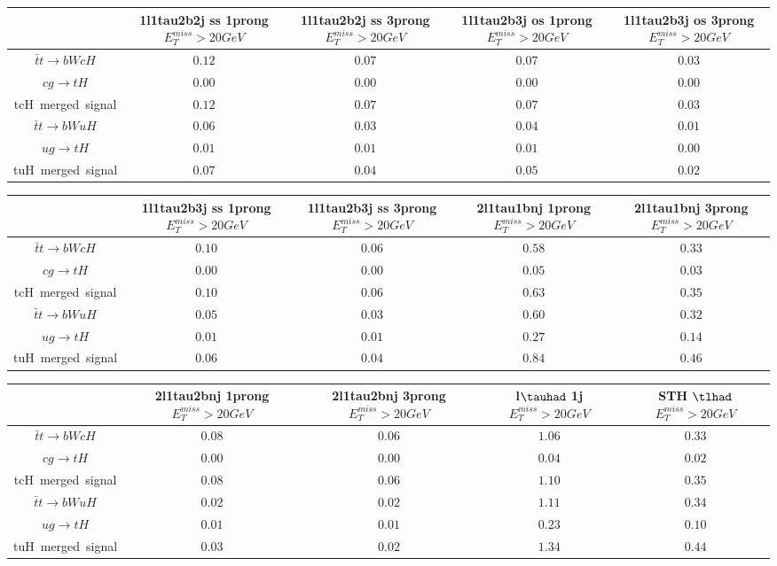 \begin{tabular}{|c|c|c|c|c|} \hline
 & 1l1tau2b2j ss 1prong  $E_T^{miss}>20GeV$ & 1l1tau2b2j ss 3prong  $E_T^{miss}>20GeV$ & 1l1tau2b3j os 1prong  $E_T^{miss}>20GeV$ & 1l1tau2b3j os 3prong  $E_T^{miss}>20GeV$\\\hline
$\bar{t}t\to bWcH$ & $0.12$ & $0.07$ & $0.07$ & $0.03$\\\hline
$cg\to tH$ & $0.00$ & $0.00$ & $0.00$ & $0.00$\\\hline
tcH~merged~signal & $0.12$ & $0.07$ & $0.07$ & $0.03$\\\hline
$\bar{t}t\to bWuH$ & $0.06$ & $0.03$ & $0.04$ & $0.01$\\\hline
$ug\to tH$ & $0.01$ & $0.01$ & $0.01$ & $0.00$\\\hline
tuH~merged~signal & $0.07$ & $0.04$ & $0.05$ & $0.02$\\\hline
\end{tabular}
\begin{tabular}{|c|c|c|c|c|} \hline
 & 1l1tau2b3j ss 1prong  $E_T^{miss}>20GeV$ & 1l1tau2b3j ss 3prong  $E_T^{miss}>20GeV$ & 2l1tau1bnj 1prong  $E_T^{miss}>20GeV$ & 2l1tau1bnj 3prong  $E_T^{miss}>20GeV$\\\hline
$\bar{t}t\to bWcH$ & $0.10$ & $0.06$ & $0.58$ & $0.33$\\\hline
$cg\to tH$ & $0.00$ & $0.00$ & $0.05$ & $0.03$\\\hline
tcH~merged~signal & $0.10$ & $0.06$ & $0.63$ & $0.35$\\\hline
$\bar{t}t\to bWuH$ & $0.05$ & $0.03$ & $0.60$ & $0.32$\\\hline
$ug\to tH$ & $0.01$ & $0.01$ & $0.27$ & $0.14$\\\hline
tuH~merged~signal & $0.06$ & $0.04$ & $0.84$ & $0.46$\\\hline
\end{tabular}
\begin{tabular}{|c|c|c|c|c|} \hline
 & 2l1tau2bnj 1prong  $E_T^{miss}>20GeV$ & 2l1tau2bnj 3prong  $E_T^{miss}>20GeV$ & l$\tauhad$ 1j  $E_T^{miss}>20GeV$ & STH $\tlhad$   $E_T^{miss}>20GeV$\\\hline
$\bar{t}t\to bWcH$ & $0.08$ & $0.06$ & $1.06$ & $0.33$\\\hline
$cg\to tH$ & $0.00$ & $0.00$ & $0.04$ & $0.02$\\\hline
tcH~merged~signal & $0.08$ & $0.06$ & $1.10$ & $0.35$\\\hline
$\bar{t}t\to bWuH$ & $0.02$ & $0.02$ & $1.11$ & $0.34$\\\hline
$ug\to tH$ & $0.01$ & $0.01$ & $0.23$ & $0.10$\\\hline
tuH~merged~signal & $0.03$ & $0.02$ & $1.34$ & $0.44$\\\hline
\end{tabular}
